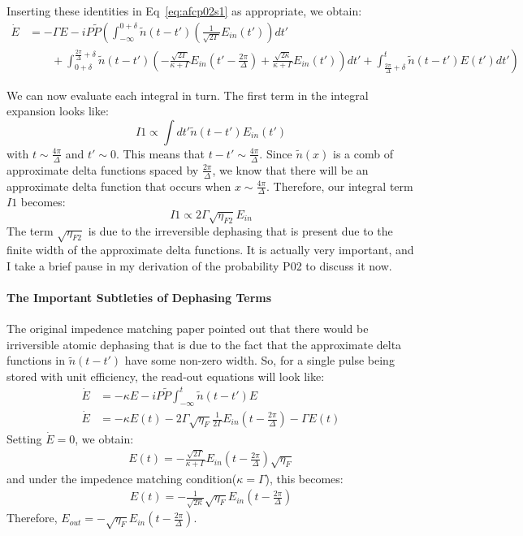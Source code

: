 \documentclass[12pt]{article}
\begin{document}
Inserting these identities in Eq~\eqref{eq:afcp02s1} as appropriate, we obtain:
\begin{align}
\dot{E} &= -\Gamma E  -i P \tilde{P}\left( \int_{-\infty}^{0+\delta}\tilde{n}(t-t')\left( \frac{1}{\sqrt{2 \Gamma}} E_{in}(t')\right)dt' \right. \\
&\left. \qquad+\int^{\frac{2 \pi}{\Delta}+\delta}_{0+\delta} \tilde{n}(t-t') \left(- \frac{\sqrt{2 \Gamma}}{\kappa +\Gamma} E_{in}(t'-\frac{2 \pi}{\Delta}) +\frac{\sqrt{2 \kappa}}{\kappa+\Gamma} E_{in}(t')\right)dt'
+ \int^t_{\frac{2 \pi}{\Delta}+\delta} \tilde{n}(t-t') E(t') dt'\right)
\end{align}

We can now evaluate each integral in turn. The first term in the integral expansion looks like:
\begin{equation}
I1 \propto \int dt' \tilde{n}(t-t')E_{in}(t')
\end{equation}
with $t \sim \frac{4 \pi}{\Delta}$ and $t'\sim 0$. This means that $t-t'\sim \frac{4\pi}{\Delta}$. Since
$\tilde{n}(x)$ is a comb of approximate delta functions spaced by $\frac{2\pi}{\Delta}$, we know that
there will be an approximate delta function that occurs when $x \sim \frac{4 \pi}{\Delta}$. Therefore, our integral term $I1$ becomes:
\begin{equation}
I1 \propto 2 \Gamma \sqrt{\eta_{F2}} E_{in}
\end{equation}
The term $\sqrt{\eta_{F2}}$ is due to the irreversible dephasing that is present due to the finite width
of the approximate delta functions. It is actually very important, and I take a brief pause in my derivation of the probability P02 to discuss it now.
\paragraph{The Important Subtleties of Dephasing Terms}
\vspace{10 mm}
The original impedence matching paper pointed out that there would be irriversible atomic dephasing that is
due to the fact that the approximate delta functions in $\tilde{n}(t-t')$ have some non-zero width. So, for a single pulse being stored with unit efficiency, the read-out equations will look like:
\begin{align}
\dot{E} &= -\kappa E - i P \tilde{P} \int^t_{-\infty} \tilde{n}(t-t') E \\
\dot{E} &= -\kappa E(t) -  2\Gamma \sqrt{\eta_{F}} \frac{1}{2\Gamma}E_{in}(t-\frac{2 \pi}{\Delta}) - \Gamma E(t)
\end{align}
Setting $\dot{E}=0$, we obtain:
\begin{align}
E(t) = -\frac{\sqrt{2 \Gamma}}{\kappa+\Gamma} E_{in}(t-\frac{2 \pi}{\Delta}) \sqrt{\eta_{F}}
\end{align}
and under the impedence matching condition($\kappa = \Gamma$), this becomes:
\begin{align}
E(t) = -\frac{1}{\sqrt{2\kappa}}\sqrt{\eta_{F}} E_{in}(t-\frac{2 \pi}{\Delta})
\end{align}
Therefore, $E_{out} = -\sqrt{\eta_F} E_{in}(t-\frac{2 \pi}{\Delta})$.
\end{document}
